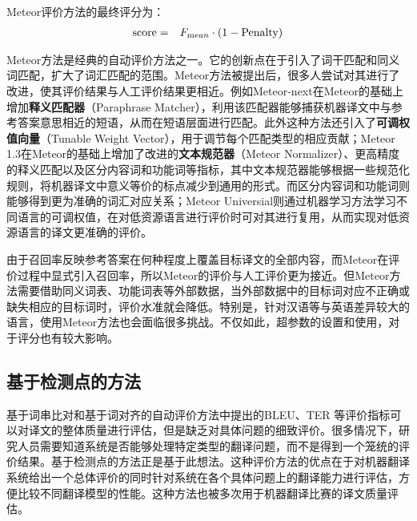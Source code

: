 \parinterval Meteor评价方法的最终评分为：
\begin{eqnarray}
\textrm {score} &=& { F_{\textrm mean}} \cdot {(1 - \textrm {Penalty})}
\label{eq:4-12}
\end{eqnarray}

\parinterval Meteor方法是经典的自动评价方法之一。它的创新点在于引入了词干匹配和同义词匹配，扩大了词汇匹配的范围。Meteor方法被提出后，很多人尝试对其进行了改进，使其评价结果与人工评价结果更相近。例如Meteor-next在Meteor的基础上增加{\small\sffamily\bfseries{释义匹配器}}（Paraphrase Matcher），利用该匹配器能够捕获机器译文中与参考答案意思相近的短语，从而在短语层面进行匹配。此外这种方法还引入了{\small\sffamily\bfseries{可调权值向量}}（Tunable Weight Vector），用于调节每个匹配类型的相应贡献；Meteor 1.3在Meteor的基础上增加了改进的{\small\sffamily\bfseries{文本规范器}}（Meteor Normalizer）、更高精度的释义匹配以及区分内容词和功能词等指标，其中文本规范器能够根据一些规范化规则，将机器译文中意义等价的标点减少到通用的形式。而区分内容词和功能词则能够得到更为准确的词汇对应关系；Meteor Universial则通过机器学习方法学习不同语言的可调权值，在对低资源语言进行评价时可对其进行复用，从而实现对低资源语言的译文更准确的评价。

\parinterval 由于召回率反映参考答案在何种程度上覆盖目标译文的全部内容，而Meteor在评价过程中显式引入召回率，所以Meteor的评价与人工评价更为接近。但Meteor方法需要借助同义词表、功能词表等外部数据，当外部数据中的目标词对应不正确或缺失相应的目标词时，评价水准就会降低。特别是，针对汉语等与英语差异较大的语言，使用Meteor方法也会面临很多挑战。不仅如此，超参数的设置和使用，对于评分也有较大影响。


\subsection{基于检测点的方法}

\parinterval 基于词串比对和基于词对齐的自动评价方法中提出的BLEU、TER 等评价指标可以对译文的整体质量进行评估，但是缺乏对具体问题的细致评价。很多情况下，研究人员需要知道系统是否能够处理特定类型的翻译问题，而不是得到一个笼统的评价结果。基于检测点的方法正是基于此想法。这种评价方法的优点在于对机器翻译系统给出一个总体评价的同时针对系统在各个具体问题上的翻译能力进行评估，方便比较不同翻译模型的性能。这种方法也被多次用于机器翻译比赛的译文质量评估。

